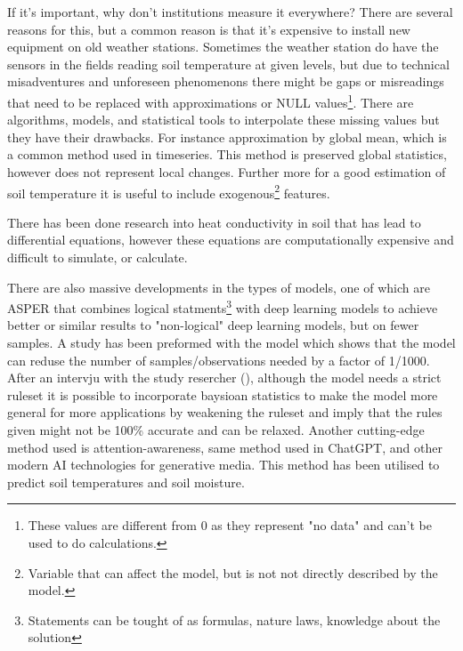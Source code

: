 If it's important, why don't institutions measure it everywhere? There are several reasons for this, but a common reason is that it's expensive to install new equipment on old weather stations. Sometimes the weather station do have the sensors in the fields reading soil temperature at given levels, but due to technical misadventures and unforeseen phenomenons there might be gaps or misreadings that need to be replaced with approximations or NULL values\footnote{These values are different from 0 as they represent "no data" and can't be used to do calculations.}. There are algorithms, models, and statistical tools to interpolate these missing values but they have their drawbacks. For instance approximation by global mean, which is a common method used in timeseries\cite{lepot_interpolation_2017}. This method is preserved global statistics, however does not represent local changes. Further more for a good estimation of soil temperature it is useful to include exogenous\footnote{Variable that can affect the model, but is not not directly described by the model.} features.

There has been done research into heat conductivity in soil that has lead to differential equations\cite{karvonen_model_1988}, however these equations\cite{fourier_analytical_2009,karvonen_model_1988} are computationally expensive and difficult to simulate, or calculate\cite{rankinen_simple_2004}. 

There are also massive developments in the types of models, one of which are ASPER that combines logical statments\footnote{Statements can be tought of as formulas, nature laws, knowledge about the solution} with deep learning models to achieve better or similar results to "non-logical" deep learning models, but on fewer samples\cite{le_asper_2023}. A study has been preformed with the model which shows that the model can reduse the number of samples/observations needed by a factor of 1/1000\cite{machot_bridging_2023}. After an intervju with the study resercher (\citeauthor{machot_bridging_2023}), although the model needs a strict ruleset it is possible to incorporate baysioan statistics to make the model more general for more applications by weakening the ruleset and imply that the rules given might not be 100\% accurate and can be relaxed. Another cutting-edge method used is attention-awareness, same method used in ChatGPT, and other modern AI technologies for generative media. This method has been utilised to predict soil temperatures and soil moisture\cite{li_attention-aware_2022}.

